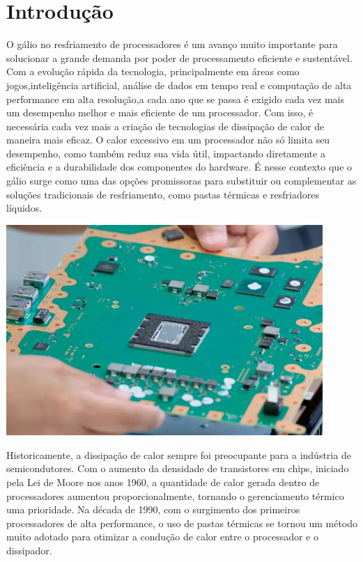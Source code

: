 \documentclass[12pt]{article}
\begin{document}
\section{Introdução}
O gálio no resfriamento de processadores é um avanço muito importante para solucionar a grande demanda por poder de processamento eficiente e sustentável. Com a evolução rápida da tecnologia, principalmente em áreas como jogos,inteligência artificial, análise de dados em tempo real e computação de alta performance em alta resolução,a cada ano que se passa é exigido cada vez mais um desempenho melhor e mais eficiente de um processador. 
Com isso, é necessária cada vez mais a criação de tecnologias de dissipação de calor de maneira mais eficaz. O calor excessivo em um processador não só limita seu desempenho, como também reduz sua vida útil, impactando diretamente a eficiência e a durabilidade dos componentes do hardware. É nesse contexto que o gálio surge como uma das opções promissoras para substituir ou complementar as soluções tradicionais de resfriamento, como pastas térmicas e resfriadores líquidos.
\begin{adjustbox}{center,caption={Placa Mãe do PS5 (Imagem: PlayStation/Reprodução)},nofloat=figure,vspace=\bigskipamount}
    \centering
    \includegraphics[width=12cm]{mobo.png}
\end{adjustbox}
Historicamente, a dissipação de calor sempre foi preocupante para a indústria de semicondutores. Com o aumento da densidade de transistores em chips, iniciado pela Lei de Moore nos anos 1960, a quantidade de calor gerada dentro de processadores aumentou proporcionalmente, tornando o gerenciamento térmico uma prioridade. Na década de 1990, com o surgimento dos primeiros processadores de alta performance, o uso de pastas térmicas se tornou um método muito adotado para otimizar a condução de calor entre o processador e o dissipador. 
\end{document}
